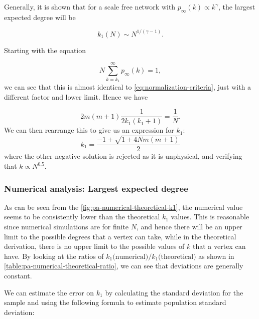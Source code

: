 Generally, it is shown \citep{Boguna2004} that for a scale free network with $p_{\infty}(k) \propto k^{\gamma}$, the largest expected degree will be

\begin{equation}
	k_1(N) \sim N^{1 / (\gamma -1)}.
	\label{eq:largest-expected-degree-research}
\end{equation}

Starting with the equation 

\begin{equation}
	N \sum_{k=k_1}^\infty p_{\infty}(k) = 1, 
	\label{eq:largest-expected-degree-criteria}
\end{equation}
we can see that this is almost identical to \autoref{eq:normalization-criteria}, just with a different factor and lower limit. Hence we have 

\begin{equation}
	2m(m+1) \frac{1}{2k_1(k_1+1)} = \frac{1}{N}.
	\label{eq:largest-expected-degree-derivation}
\end{equation}
We can then rearrange this to give us an expression for $k_1$:
\begin{equation}
	k_1 = \frac{-1 + \sqrt{1 + 4Nm(m+1)}}{2}
	\label{eq:pa-k1-expression}
\end{equation}
where the other negative solution is rejected as it is unphysical, and verifying that $k \propto N^{0.5}$. 

\subsubsection{Numerical analysis: Largest expected degree}\label{subsection:pa-numerical-largest-degree}

As can be seen from the \autoref{fig:pa-numerical-theoretical-k1}, the numerical value seems to be consistently lower than the theoretical $k_1$ values. This is reasonable since numerical simulations are for finite $N$, and hence there will be an upper limit to the possible degrees that a vertex can take, while in the theoretical derivation, there is no upper limit to the possible values of $k$ that a vertex can have. By looking at the ratios of $ k_1 \text{(numerical)} / k_1 \text{(theoretical)} $ as shown in \autoref{table:pa-numerical-theoretical-ratio}, we can see that deviations are generally constant. 

We can estimate the error on $k_1$ by calculating the standard deviation for the sample and using the following formula to estimate population standard deviation:

